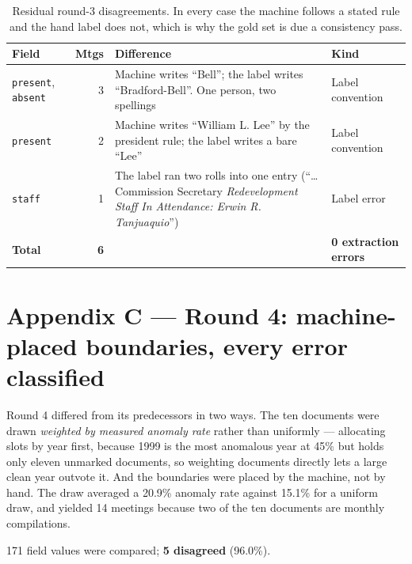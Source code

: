 \documentclass[11pt]{article}
\begin{document}
\begin{table}[h]
\centering
\begin{tabular}{p{}rp{}p{}}
\toprule
Field & Mtgs & Difference & Kind \\
\midrule
\texttt{present}, \texttt{absent} & 3 & Machine writes ``Bell''; the label writes
``Bradford-Bell''. One person, two spellings & Label convention \\
\texttt{present} & 2 & Machine writes ``William L. Lee'' by the president rule; the label
writes a bare ``Lee'' & Label convention \\
\texttt{staff} & 1 & The label ran two rolls into one entry (``\ldots Commission Secretary
\emph{Redevelopment Staff In Attendance: Erwin R. Tanjuaquio}'') & Label error \\
\midrule
\textbf{Total} & \textbf{6} & & \textbf{0 extraction errors} \\
\bottomrule
\end{tabular}
\caption{Residual round-3 disagreements. In every case the machine follows a stated rule and
the hand label does not, which is why the gold set is due a consistency pass.}
\end{table}


\section{Appendix C --- Round 4: machine-placed boundaries, every error classified}

Round 4 differed from its predecessors in two ways. The ten documents were drawn
\emph{weighted by measured anomaly rate} rather than uniformly --- allocating slots by year
first, because 1999 is the most anomalous year at 45\% but holds only eleven unmarked
documents, so weighting documents directly lets a large clean year outvote it. And the
boundaries were placed by the machine, not by hand. The draw averaged a 20.9\% anomaly rate
against 15.1\% for a uniform draw, and yielded 14 meetings because two of the ten documents
are monthly compilations.

171 field values were compared; \textbf{5 disagreed} (96.0\%).
\end{document}
